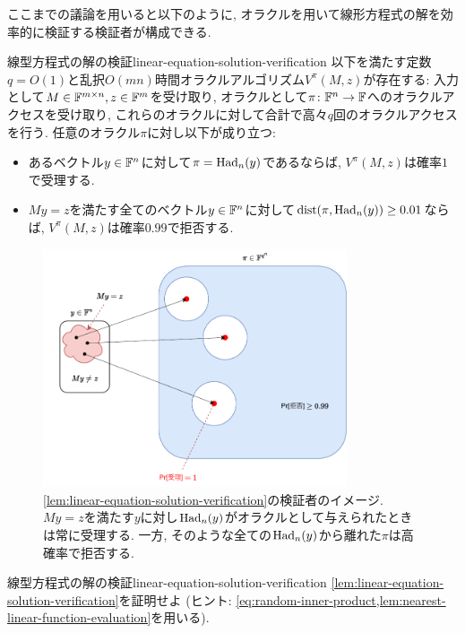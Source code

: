 ここまでの議論を用いると以下のように, オラクルを用いて線形方程式の解を効率的に検証する検証者が構成できる.

  \begin{lemma}{線型方程式の解の検証}{linear-equation-solution-verification}
    以下を満たす定数$q=O(1)$と乱択$O(mn)$時間オラクルアルゴリズム$V^{\pi}(M,z)$が存在する:
    入力として$M\in\mathbb{F}^{m\times n},z\in\mathbb{F}^m$を受け取り, オラクルとして$\pi\colon\mathbb{F}^n\to\mathbb{F}$へのオラクルアクセスを受け取り, これらのオラクルに対して合計で高々$q$回のオラクルアクセスを行う. 任意のオラクル$\pi$に対し以下が成り立つ:
    \begin{itemize}
      \item あるベクトル$y\in\mathbb{F}^n$に対して$\pi=\mathrm{Had}_n(y)$であるならば, $V^{\pi}(M,z)$は確率$1$で受理する.
      \item $My=z$を満たす全てのベクトル$y\in\mathbb{F}^n$に対して$\mathrm{dist}(\pi,\mathrm{Had}_n(y))\ge 0.01$ならば, $V^{\pi}(M,z)$は確率$0.99$で拒否する.
    \end{itemize}
  \end{lemma}

  \begin{figure}[htbp]
    \centering
    \includegraphics[width=0.8\textwidth]{images/linear_verification.pdf}
    \caption{\cref{lem:linear-equation-solution-verification}の検証者のイメージ. $My=z$を満たす$y$に対し$\mathrm{Had}_n(y)$がオラクルとして与えられたときは常に受理する. 一方, そのような全ての$\mathrm{Had}_n(y)$から離れた$\pi$は高確率で拒否する.}
  \end{figure}
  
  \begin{exercise}{線型方程式の解の検証}{linear-equation-solution-verification}
    \cref{lem:linear-equation-solution-verification}を証明せよ (ヒント: \cref{eq:random-inner-product,lem:nearest-linear-function-evaluation}を用いる).
  \end{exercise}

